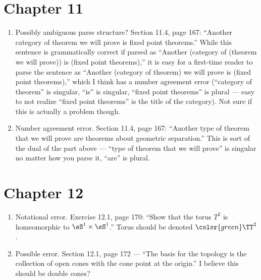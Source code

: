 \documentclass{fkletter}
\begin{document}
\section*{Chapter 11}
\begin{enumerate}
  \item Possibly ambiguous parse structure? Section 11.4, page 167: ``Another
    category of theorem we will prove is fixed point theorems.'' While this
    sentence is grammatically correct if parsed as ``Another (category of
    (theorem we will prove)) is (fixed point theorems),'' {\color{red}it is easy
      for a first-time reader to parse the sentence as ``Another (category of
      theorem) we will prove is (fixed point theorems),'' which I think has a
      number agreement error (``category of theorem'' is singular, ``is'' is
      singular, ``fixed point theorems'' is plural --- easy to not realize
      ``fixed point theorems'' is the title of the category).} Not sure if this
    is actually a problem though.
  \item Number agreement error. Section 11.4, page 167: ``Another type of
    theorem that we will prove {\color{red} are} theorems about geometric
    separation.'' This is sort of the dual of the part above --- ``type of
    theorem that we will prove'' is singular no matter how you parse it, ``are''
    is plural.
\end{enumerate}
\section*{Chapter 12}
\begin{enumerate}
  \item Notational error. Exercise 12.1, page 170: ``Show that the torus
    {\color{red}$T^2$} is homeomorphic to $\sS^1 \times \sS^1$.'' Torus should
    be denoted $\color{green}\TT^2$.
  \item Possible error. Section 12.1, page 172 --- ``The basis for the topology
    is the collection of {\color{red}open cones} with the cone point at the
    origin.'' I believe this should be double cones?
\end{enumerate}
\end{document}
